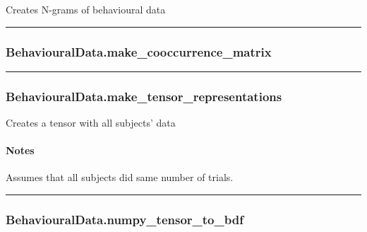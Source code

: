 Creates N-grams of behavioural data

\begin{center}\rule{0.5\linewidth}{\linethickness}\end{center}

\subsubsection{BehaviouralData.make\_cooccurrence\_matrix}\label{behaviouraldata.make_cooccurrence_matrix}

\begin{Shaded}
\begin{Highlighting}[]
\OperatorTok{=<} \OperatorTok{>}\NormalTok{)}
\end{Highlighting}
\end{Shaded}

\begin{center}\rule{0.5\linewidth}{\linethickness}\end{center}

\subsubsection{BehaviouralData.make\_tensor\_representations}\label{behaviouraldata.make_tensor_representations}

\begin{Shaded}
\begin{Highlighting}[]
\NormalTok{)}
\end{Highlighting}
\end{Shaded}

Creates a tensor with all subjects' data

\paragraph{Notes}\label{notes}

Assumes that all subjects did same number of trials.

\begin{center}\rule{0.5\linewidth}{\linethickness}\end{center}

\subsubsection{BehaviouralData.numpy\_tensor\_to\_bdf}\label{behaviouraldata.numpy_tensor_to_bdf}

